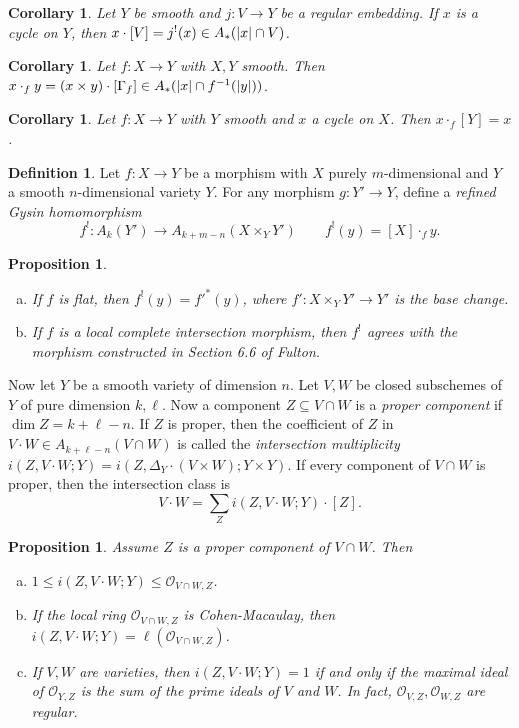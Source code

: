 \documentclass[leqno, openany]{memoir}
\newtheorem{cor}[thm]{Corollary}
\newtheorem{prop}[thm]{Proposition}
\theoremstyle{definition}
\newtheorem{defn}[thm]{Definition}
\theoremstyle{remark}
\theoremstyle{plain}
\theoremstyle{definition}
\theoremstyle{remark}
\newcommand{\mc}[1]{\mathcal{#1}}
\begin{document}
\begin{cor}
    Let $Y$ be smooth and $j \colon V \to Y$ be a regular embedding. If $x$ is a cycle on $Y$, then $x \cdot [V] = j^!(x) \in A_*(\abs{x} \cap V)$.
\end{cor}

\begin{cor}
    Let $f \colon X \to Y$ with $X,Y$ smooth. Then $x \cdot_f y = (x \times y) \cdot [\Gamma_f] \in A_*(\abs{x} \cap f^{-1}(\abs{y}))$.
\end{cor}

\begin{cor}
    Let $f \colon X \to Y$ with $Y$ smooth and $x$ a cycle on $X$. Then $x \cdot_f [Y] = x$.
\end{cor}

\begin{defn}
    Let $f \colon X \to Y$ be a morphism with $X$ purely $m$-dimensional and $Y$ a smooth $n$-dimensional variety $Y$. For any morphism $g \colon Y' \to Y$, define a \textit{refined Gysin homomorphism}
    \[ f^{!} \colon A_k(Y') \to A_{k+m-n}(X \times_Y Y') \qquad f^!(y) = [X] \cdot_f y. \]
\end{defn}

\begin{prop}\leavevmode
    \begin{enumerate}[(a)]
        \item If $f$ is flat, then $f^!(y) = f'^*(y)$, where $f' \colon X \times_Y Y' \to Y'$ is the base change.
        \item If $f$ is a local complete intersection morphism, then $f^{!}$ agrees with the morphism constructed in Section 6.6 of Fulton.
    \end{enumerate}
\end{prop}

Now let $Y$ be a smooth variety of dimension $n$. Let $V, W$ be closed subschemes of $Y$ of pure dimension $k, \ell$. Now a component $Z \subseteq V \cap W$ is a \textit{proper component} if $\dim Z = k + \ell - n$. If $Z$ is proper, then the coefficient of $Z$ in $V \cdot W \in A_{k+\ell-n}(V \cap W)$ is called the \textit{intersection multiplicity} $i(Z, V \cdot W; Y) = i(Z, \Delta_Y \cdot (V \times W); Y \times Y)$. If every component of $V \cap W$ is proper, then the intersection class is
\[ V \cdot W = \sum_Z i(Z, V \cdot W; Y) \cdot [Z]. \]
\begin{prop}
    Assume $Z$ is a proper component of $V \cap W$. Then
    \begin{enumerate}[(a)]
        \item $1 \leq i(Z, V \cdot W; Y) \leq \mc{O}_{V \cap W, Z}$.
        \item If the local ring $\mc{O}_{V \cap W, Z}$ is Cohen-Macaulay, then $i(Z,V \cdot W; Y) = \ell(\mc{O}_{V \cap W, Z})$.
        \item If $V, W$ are varieties, then $i(Z, V \cdot W; Y) = 1$ if and only if the maximal ideal of $\mc{O}_{Y,Z}$ is the sum of the prime ideals of $V$ and $W$. In fact, $\mc{O}_{V,Z}, \mc{O}_{W,Z}$ are regular.
    \end{enumerate}
\end{prop}
\end{document}
